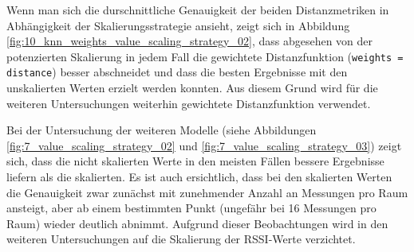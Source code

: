 Wenn man sich die durschnittliche Genauigkeit der beiden Distanzmetriken in Abhängigkeit der Skalierungsstrategie ansieht, zeigt sich in Abbildung \ref{fig:10_knn_weights_value_scaling_strategy_02}, dass abgesehen von der potenzierten Skalierung in jedem Fall die gewichtete Distanzfunktion (\texttt{weights = distance}) besser abschneidet und dass die besten Ergebnisse mit den unskalierten Werten erzielt werden konnten. Aus diesem Grund wird für die weiteren Untersuchungen weiterhin gewichtete Distanzfunktion verwendet.



Bei der Untersuchung der weiteren Modelle (siehe Abbildungen \ref{fig:7_value_scaling_strategy_02} und \ref{fig:7_value_scaling_strategy_03}) zeigt sich, dass die nicht skalierten Werte in den meisten Fällen bessere Ergebnisse liefern als die skalierten. Es ist auch ersichtlich, dass bei den skalierten Werten die Genauigkeit zwar zunächst mit zunehmender Anzahl an Messungen pro Raum ansteigt, aber ab einem bestimmten Punkt (ungefähr bei 16 Messungen pro Raum) wieder deutlich abnimmt. Aufgrund dieser Beobachtungen wird in den weiteren Untersuchungen auf die Skalierung der RSSI-Werte verzichtet.

